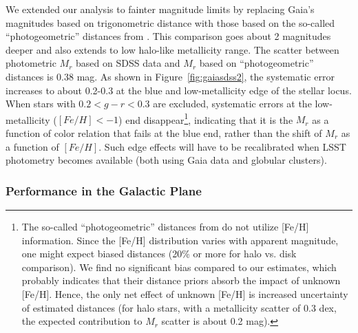 We extended our analysis to fainter magnitude limits by replacing Gaia's magnitudes based on trigonometric distance with those based on
the so-called ``photogeometric'' distances from \cite{bailer-jones_estimating_2021}. This comparison goes about 2
magnitudes deeper and also extends to low halo-like metallicity range. The scatter between photometric $M_r$ based on SDSS data and
$M_r$ based on ``photogeometric'' distances is 0.38 mag. As shown in Figure~\ref{fig:gaiasdss2}, the systematic error
increases to about 0.2-0.3 at the blue and low-metallicity edge of the stellar locus. When stars with $0.2 < g-r < 0.3$ are excluded,
systematic errors at the low-metallicity ($[Fe/H]<-1$) end disappear\footnote{The so-called ``photogeometric'' distances from \cite{bailer-jones_estimating_2021} do not utilize [Fe/H] information. Since the [Fe/H] distribution varies with apparent magnitude, one might expect biased distances (20\% or more for halo vs. disk comparison). We find no significant bias compared to our estimates, which probably indicates that their distance priors absorb the impact of unknown [Fe/H]. Hence, the only net effect of unknown [Fe/H] is increased uncertainty of estimated distances (for halo stars, with a metallicity scatter of 0.3 dex, the expected contribution to $M_r$ scatter is about 0.2 mag).}, indicating that it is the $M_r$ as a function of color relation that fails at the blue end,
rather than the shift of $M_r$ as a function of $[Fe/H]$. Such edge effects will have to be recalibrated when LSST photometry becomes available
(both using Gaia data and globular clusters). 



\subsubsection{Performance in the Galactic Plane}  

